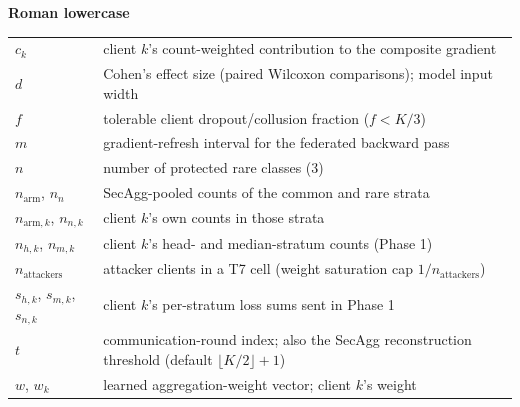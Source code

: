 \documentclass[11pt,a4paper]{report}
\begin{document}
\noindent\textbf{Roman lowercase}
\begin{center}
\begin{tabular}{@{}p{}p{}@{}}
$c_k$ & client $k$'s count-weighted contribution to the composite gradient\\
$d$ & Cohen's effect size (paired Wilcoxon comparisons); model input width\\
$f$ & tolerable client dropout/collusion fraction ($f < K/3$)\\
$m$ & gradient-refresh interval for the federated backward pass\\
$n$ & number of protected rare classes (3)\\
$n_{\mathrm{arm}}$, $n_n$ & SecAgg-pooled counts of the common and rare strata\\
$n_{\mathrm{arm},k}$, $n_{n,k}$ & client $k$'s own counts in those strata\\
$n_{h,k}$, $n_{m,k}$ & client $k$'s head- and median-stratum counts (Phase 1)\\
$n_{\mathrm{attackers}}$ & attacker clients in a T7 cell (weight saturation cap $1/n_{\mathrm{attackers}}$)\\
$s_{h,k}$, $s_{m,k}$, $s_{n,k}$ & client $k$'s per-stratum loss sums sent in Phase 1\\
$t$ & communication-round index; also the SecAgg reconstruction threshold
(default $\lfloor K/2\rfloor+1$)\\
$w$, $w_k$ & learned aggregation-weight vector; client $k$'s weight\\
\end{tabular}
\end{center}
\end{document}
